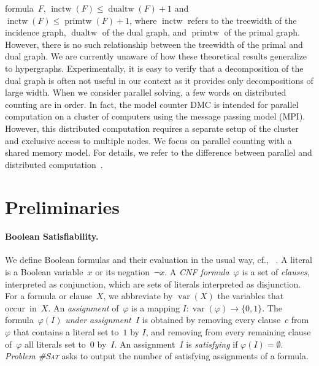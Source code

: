 \documentclass{llncs}
\newcommand{\longversion}[1]{#1}
\newcommand{\cSAT}{\textsc{\#Sat}\xspace}%
\DeclareMathOperator{\inctw}{inctw}
\DeclareMathOperator{\primtw}{primtw}
\DeclareMathOperator{\dualtw}{dualtw}
\DeclareMathOperator{\var}{var}
\begin{document}
formula~$F$, $\inctw(F) \leq \dualtw(F) + 1$ and
$\inctw(F) \leq \primtw(F) + 1$, where $\inctw$ refers to the treewidth
of the incidence graph, $\dualtw$ of the dual graph, and $\primtw$ of
the primal graph.
%
%
%
%
%
%
However, there is no such relationship between the treewidth of the
primal and dual graph. We are currently unaware of how these
theoretical results generalize to hypergraphs.
%
%
Experimentally, it is easy to verify that a decomposition of the dual
graph is often not useful in our context as it provides only
decompositions of large width.
%
When we consider parallel solving, a few words on distributed counting
are in order. In fact, the model counter DMC
\cite{LagniezMarquisSzczepanski18a} is intended for parallel
computation on a cluster of computers using the message passing model
(MPI). However, this distributed computation requires a separate setup
of the cluster and exclusive access to multiple nodes. We focus on
parallel counting with a shared memory model. For details, we refer to
the difference between parallel and distributed
computation~\cite{Raynal15a}.




\section{Preliminaries}

\label{fig:prim1}%
\paragraph*{Boolean Satisfiability.}
  We define Boolean formulas and their evaluation in the usual
  way, cf., ~\cite{GomesKautzSabharwalSelman08a,KleineBuningLettman99}.
  A literal is a Boolean variable~$x$ or its negation~$\neg
  x$.
  A \emph{CNF formula}~$\varphi$ is a set of \emph{clauses}, interpreted as conjunction, which are sets of literals
  interpreted as disjunction. For a formula or clause~$X$, we
  abbreviate by $\var(X)$ the variables that occur~in~$X$.
%
%
%
%
%
%
%
%
%
An \emph{assignment} of~$\varphi$ is a mapping
$I: \var(\varphi) \rightarrow \{0,1\}$.
%
%
%
%
%
%
%
The formula~$\varphi(I)$ \emph{under assignment~$I$} is obtained
by removing every clause~$c$ from $\varphi$ that contains a literal set to~$1$
by $I$, and removing from every remaining clause of~$\varphi$ all literals set
to~$0$ by~$I$. An assignment~$I$ is \emph{satisfying} if
$\varphi(I)=\emptyset$.
%
\emph{Problem \cSAT} asks to output the number of satisfying assignments
of a formula.
%
%
%
%
%
%
%
%
%
%
%
%
%
%
%
%
%
%
%
%
%
%
\end{document}
